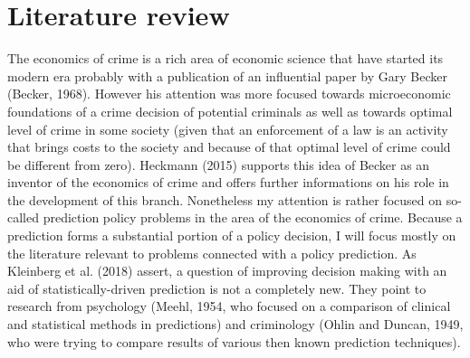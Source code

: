 \documentclass[12pt, twoside,openany]{book} %
\begin{document}
\section{Literature review}     %
The economics of crime is a rich area of economic science that have started its modern era probably with a publication of an influential paper by Gary Becker (Becker, 1968). However his attention was more focused towards microeconomic foundations of a crime decision of potential criminals as well as towards optimal level of crime in some society (given that an enforcement of a law is an activity that brings costs to the society and because of that optimal level of crime could be different from zero). Heckmann (2015) supports this idea of Becker as an inventor of the economics of crime and offers further informations on his role in the development of this branch.\newline
Nonetheless my attention is rather focused on so-called prediction policy problems in the area of the economics of crime. Because a prediction forms a substantial portion of a policy decision, I will focus mostly on the literature relevant to problems connected with a policy prediction. As Kleinberg et al. (2018) assert, a question of improving decision making with an aid of statistically-driven prediction is not a completely new. They point to research from psychology (Meehl, 1954, who focused on a comparison of clinical and statistical methods in predictions) and criminology (Ohlin and Duncan, 1949, who were trying to compare results of various then known prediction techniques). \newline
\end{document}
